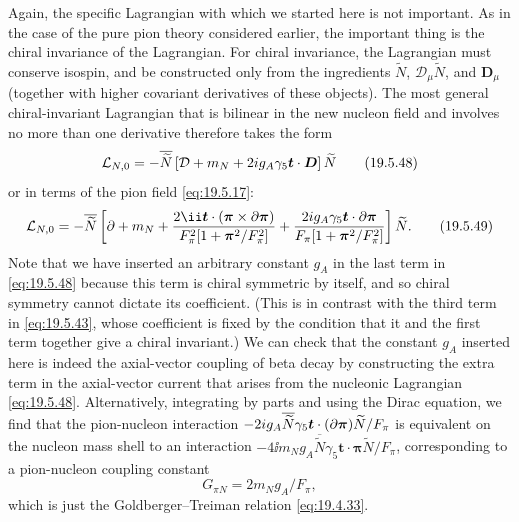 Again, the specific Lagrangian with which we started here is not important. As in the case of the pure pion theory considered earlier, the important thing is the chiral invariance of the Lagrangian. For chiral invariance, the Lagrangian must conserve isospin, and be constructed only from the ingredients $\widetilde N$, $\mathcal D_\mu\widetilde N$, and $\boldsymbol D_\mu$ (together with higher covariant derivatives of these objects). The most general chiral-invariant Lagrangian that is bilinear in the new nucleon field and involves no more than one derivative therefore takes the form
\begin{equation}
\mathcal L_{N,0}
=-\overline{\widetilde N}
\left[
\sl{\mathcal D}+m_N
+2ig_A\gamma_5\boldsymbol t\cdot\sl{\boldsymbol D}
\right]\widetilde N
\tag{19.5.48}\label{eq:19.5.48}
\end{equation}
or in terms of the pion field \eqref{eq:19.5.17}:
\begin{equation}
\mathcal L_{N,0}
=-\overline{\widetilde N}
\left[
\sl{\partial}+m_N
+\frac{2\ii\boldsymbol t\cdot
(\boldsymbol{\pi}\times\sl{\partial}\boldsymbol{\pi})}
{F_\pi^2[1+\boldsymbol{\pi}^2/F_\pi^2]}
+\frac{2ig_A\gamma_5\boldsymbol t\cdot
\sl{\partial}\boldsymbol{\pi}}
{F_\pi[1+\boldsymbol{\pi}^2/F_\pi^2]}
\right]\widetilde N.
\tag{19.5.49}\label{eq:19.5.49}
\end{equation}
Note that we have inserted an arbitrary constant $g_A$ in the last term in \eqref{eq:19.5.48} because this term is chiral symmetric by itself, and so chiral symmetry cannot dictate its coefficient. (This is in contrast with the third term in \eqref{eq:19.5.43}, whose coefficient is fixed by the condition that it and the first term together give a chiral invariant.) We can check that the constant $g_A$ inserted here is indeed the axial-vector coupling of beta decay by constructing the extra term in the axial-vector current that arises from the nucleonic Lagrangian \eqref{eq:19.5.48}. Alternatively, integrating by parts and using the Dirac equation, we find that the pion-nucleon interaction $-2ig_A\overline{\widetilde N}\gamma_5\boldsymbol t\cdot(\sl{\partial}\boldsymbol{\pi})\widetilde N/F_\pi$ is equivalent on the nucleon mass shell to an interaction $-4\ii m_Ng_A\overline{\widetilde N}\gamma_5\boldsymbol t\cdot\boldsymbol{\pi}\widetilde N/F_\pi$, corresponding to a pion-nucleon coupling constant
\[
G_{\pi N}=2m_Ng_A/F_\pi,
\]
which is just the Goldberger--Treiman relation \eqref{eq:19.4.33}.

